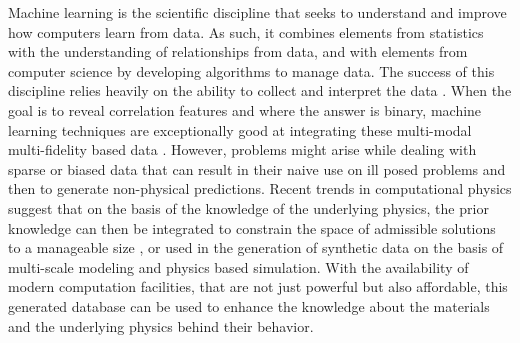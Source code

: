 Machine learning is the scientific discipline that seeks to understand and improve how computers learn from data. As such, it combines elements from statistics with the understanding of relationships from data, and with elements from computer science by developing algorithms to manage data. The success of this discipline relies heavily on the ability to collect and interpret the data \cite{pengMultiscaleModelingMeets2020}. When the goal is to reveal correlation features and where the answer is binary, machine learning techniques are exceptionally good at integrating these multi-modal multi-fidelity based data \cite{krizhevskyImageNetClassificationDeep2012}. However, problems might arise while dealing with sparse or biased data \cite{rileyThreePitfallsAvoid2019} that can result in their naive use on ill posed problems and then to generate non-physical predictions. Recent trends in computational physics suggest that on the basis of the knowledge of the underlying physics, the prior knowledge can then be integrated to constrain the space of admissible solutions to a manageable size \cite{bruntonDiscoveringGoverningEquations2016, raissiPhysicsinformedNeuralNetworks2019}, or used in the generation of synthetic data on the basis of multi-scale modeling and physics based simulation\cite{contiDataDrivenProblemsElasticity2018}. With the availability of modern computation facilities, that are not just powerful but also affordable, this generated database can be used to enhance the knowledge about the materials and the underlying physics behind their behavior.

